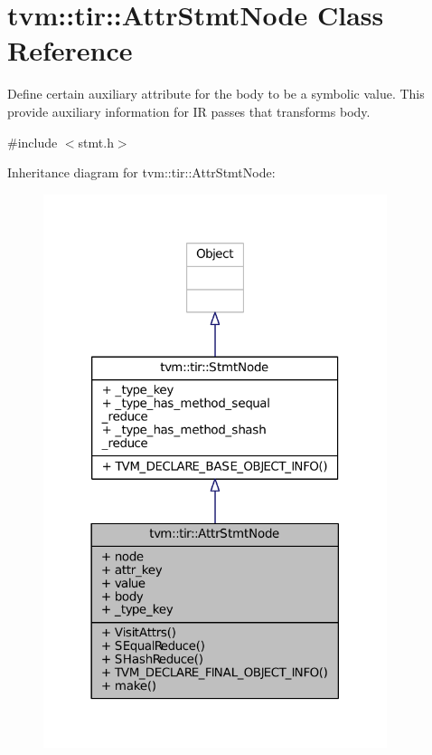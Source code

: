 \hypertarget{classtvm_1_1tir_1_1AttrStmtNode}{}\section{tvm\+:\+:tir\+:\+:Attr\+Stmt\+Node Class Reference}
\label{classtvm_1_1tir_1_1AttrStmtNode}


Define certain auxiliary attribute for the body to be a symbolic value. This provide auxiliary information for IR passes that transforms body.  




{\ttfamily \#include $<$stmt.\+h$>$}



Inheritance diagram for tvm\+:\+:tir\+:\+:Attr\+Stmt\+Node\+:
\nopagebreak
\begin{figure}[H]
\begin{center}
\leavevmode
\includegraphics[width=285pt]{classtvm_1_1tir_1_1AttrStmtNode__inherit__graph}
\end{center}
\end{figure}


